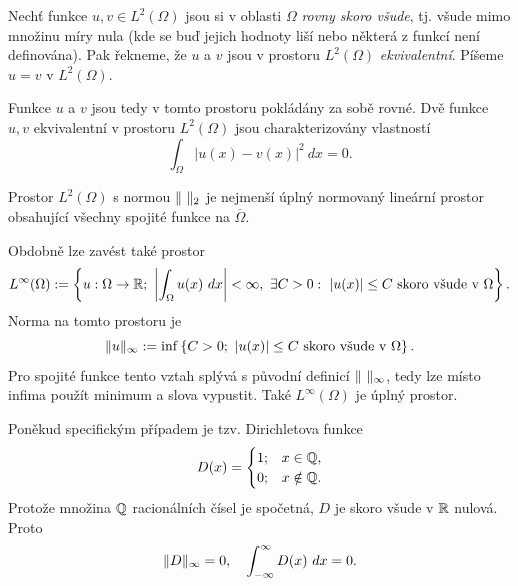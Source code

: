 \begin{df}
Nechť funkce $u,v\in L^2(\Omega)$ jsou si v oblasti $\Omega$ \emph{rovny skoro všude}, tj. všude mimo množinu míry nula (kde se buď jejich hodnoty liší nebo některá z funkcí není definována).
Pak řekneme, že $u$ a $v$ jsou v prostoru $L^2(\Omega)$ \emph{ekvivalentní}.
Píšeme $u=v$ v $L^2(\Omega)$.
\end{df}
Funkce $u$ a $v$ jsou tedy v tomto prostoru pokládány za sobě rovné.
Dvě funkce $u,v$ ekvivalentní v prostoru $L^2(\Omega)$ jsou charakterizovány vlastností
\[ \int_\Omega|u(x)-v(x)|^2~dx = 0. \]


\begin{veta}
Prostor $L^2(\Omega)$ s normou $\|\ \|_2$ je nejmenší úplný normovaný lineární prostor obsahující všechny spojité funkce na $\overline\Omega$.
\end{veta}

Obdobně lze zavést také prostor
\[ L^\infty(\Omega):=\left\{u:\Omega\rightarrow\mathbb R;~\left|\int_\Omega u(x)~dx\right|<\infty, ~\exists C>0:~|u(x)|\le C \mbox{ skoro všude v }\Omega\right\}. \]
Norma na tomto prostoru je
\[ \|u\|_\infty := \inf\left\{C>0;~|u(x)|\le C \mbox{ skoro všude v }\Omega\right\}. \]
Pro spojité funkce tento vztah splývá s původní definicí $\norm{\ }_\infty$, tedy lze místo infima použít minimum a slova  vypustit.
Také $L^\infty(\Omega)$ je úplný prostor.
\begin{ex}
Poněkud specifickým případem je tzv. Dirichletova funkce
\[ D(x) = \begin{cases}1;&x\in\mathbb Q,\\0;&x\notin\mathbb Q.\end{cases} \]
Protože množina $\mathbb Q$ racionálních čísel je spočetná, $D$ je skoro všude v $\mathbb R$ nulová. Proto
\[ \|D\|_\infty = 0,\quad \int_{-\infty}^\infty D(x)~dx=0. \]
\end{ex}


